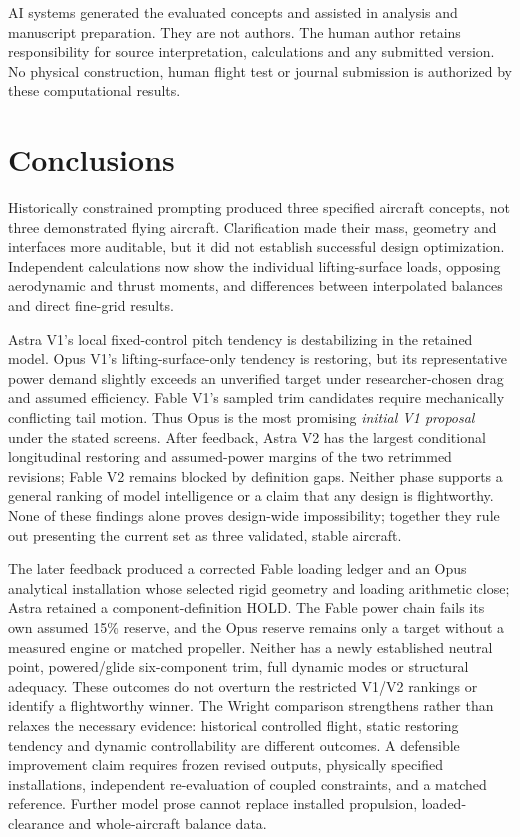 \documentclass[11pt,a4paper]{article}
\begin{document}
AI systems generated the evaluated concepts and assisted in analysis and manuscript preparation. They are not authors. The human author retains responsibility for source interpretation, calculations and any submitted version. No physical construction, human flight test or journal submission is authorized by these computational results.

\section{Conclusions}
Historically constrained prompting produced three specified aircraft concepts, not three demonstrated flying aircraft. Clarification made their mass, geometry and interfaces more auditable, but it did not establish successful design optimization. Independent calculations now show the individual lifting-surface loads, opposing aerodynamic and thrust moments, and differences between interpolated balances and direct fine-grid results.

Astra V1's local fixed-control pitch tendency is destabilizing in the retained model. Opus V1's lifting-surface-only tendency is restoring, but its representative power demand slightly exceeds an unverified target under researcher-chosen drag and assumed efficiency. Fable V1's sampled trim candidates require mechanically conflicting tail motion. Thus Opus is the most promising \emph{initial V1 proposal} under the stated screens. After feedback, Astra V2 has the largest conditional longitudinal restoring and assumed-power margins of the two retrimmed revisions; Fable V2 remains blocked by definition gaps. Neither phase supports a general ranking of model intelligence or a claim that any design is flightworthy. None of these findings alone proves design-wide impossibility; together they rule out presenting the current set as three validated, stable aircraft.

The later feedback produced a corrected Fable loading ledger and an Opus analytical installation whose selected rigid geometry and loading arithmetic close; Astra retained a component-definition HOLD. The Fable power chain fails its own assumed 15\% reserve, and the Opus reserve remains only a target without a measured engine or matched propeller. Neither has a newly established neutral point, powered/glide six-component trim, full dynamic modes or structural adequacy. These outcomes do not overturn the restricted V1/V2 rankings or identify a flightworthy winner. The Wright comparison strengthens rather than relaxes the necessary evidence: historical controlled flight, static restoring tendency and dynamic controllability are different outcomes. A defensible improvement claim requires frozen revised outputs, physically specified installations, independent re-evaluation of coupled constraints, and a matched reference. Further model prose cannot replace installed propulsion, loaded-clearance and whole-aircraft balance data.
\end{document}
